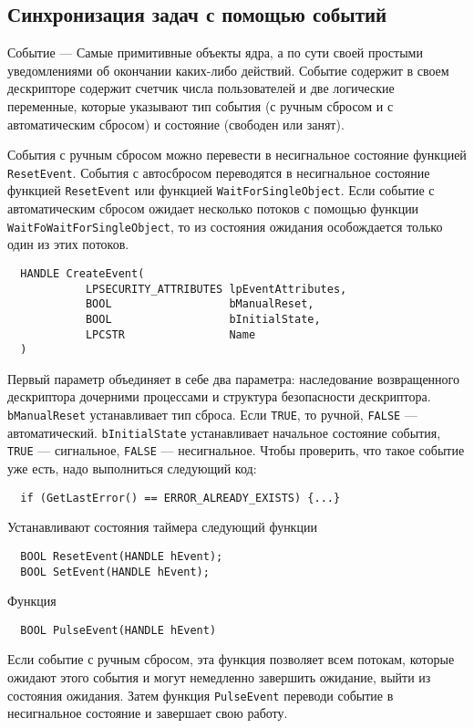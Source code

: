\subsection{Синхронизация задач с помощью событий}
Событие --- Самые примитивные объекты ядра, а по сути своей простыми
уведомлениями об окончании каких-либо действий. Событие содержит в своем
дескрипторе содержит счетчик числа пользователей и две логические переменные,
которые указывают тип события (с ручным сбросом и с автоматическим сбросом) и
состояние (свободен или занят).

События с ручным сбросом можно перевести в несигнальное состояние функцией
\verb!ResetEvent!. События с автосбросом переводятся в несигнальное состояние
функцией \verb!ResetEvent! или функцией \verb!WaitForSingleObject!. Если событие
с автоматическим сбросом ожидает несколько потоков с помощью функции
\verb!WaitFoWaitForSingleObject!, то из состояния ожидания особождается только
один из этих потоков.

\begin{verbatim}
  HANDLE CreateEvent(
            LPSECURITY_ATTRIBUTES lpEventAttributes,
            BOOL                  bManualReset,
            BOOL                  bInitialState,
            LPCSTR                Name
  )
\end{verbatim}
Первый параметр объединяет в себе два параметра: наследование возвращенного
дескриптора дочерними процессами и структура безопасности дескриптора.
\verb!bManualReset! устанавливает тип сброса. Если \verb!TRUE!, то ручной,
\verb!FALSE! --- автоматический. \verb!bInitialState! устанавливает начальное
состояние события, \verb!TRUE! --- сигнальное, \verb!FALSE! --- несигнальное.
Чтобы проверить, что такое событие уже есть, надо выполниться следующий код:
\begin{verbatim}
  if (GetLastError() == ERROR_ALREADY_EXISTS) {...}
\end{verbatim}

Устанавливают состояния таймера следующий функции
\begin{verbatim}
  BOOL ResetEvent(HANDLE hEvent);
  BOOL SetEvent(HANDLE hEvent);
\end{verbatim}

Функция 
\begin{verbatim}
  BOOL PulseEvent(HANDLE hEvent)
\end{verbatim}
Если событие с ручным сбросом, эта функция позволяет всем потокам, которые
ожидают этого события и могут немедленно завершить ожидание, выйти из состояния
ожидания. Затем функция \verb!PulseEvent! переводи событие в несигнальное
состояние и завершает свою работу.

